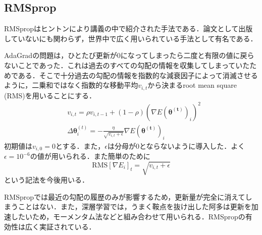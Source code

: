 \documentclass[a4paper,11pt]{jsreport}
\begin{document}
\subsection{RMSprop}
RMSpropはヒントンにより講義の中で紹介された手法である．論文として出版していないにも関わらず，世界中で広く用いられている手法として有名である．\par
AdaGradの問題は，ひとたび更新が$0$になってしまったら二度と有限の値に戻らないことであった．これは過去のすべての勾配の情報を収集してしまっていたためである．そこで十分過去の勾配の情報を指数的な減衰因子によって消滅させるように，二乗和ではなく指数的な移動平均$v_{i,t}$から決まるroot mean square (RMS)を用いることにする．
\begin{align}
   & v_{i,t}
  = \rho v_{i,t-1} + (1-\rho) (\nabla E(\bm{\theta^{(t)}})_i)^2 \label{RMSprop} \\
   & \Delta \bm{\theta}_i^{(t)}
  = - \frac{\eta}{\sqrt{v_{i,t}+\epsilon}} \nabla E(\bm{\theta^{(t)}})_i
\end{align}
初期値は$v_{i,0}=0$とする．また，$\epsilon$は分母が$0$とならないように導入した．よく$\epsilon = 10^{-6}$の値が用いられる．また簡単のために
\begin{equation}
  \mathrm{RMS}[\nabla E_i]_t = \sqrt{v_{i,t} + \epsilon}
\end{equation}
という記法を今後用いる．\par
RMSpropでは最近の勾配の履歴のみが影響するため，更新量が完全に消えてしまうことはない．また，深層学習では，うまく鞍点を抜け出した阿多は更新を加速したいため，モーメンタム法などと組み合わせて用いられる．RMSpropの有効性は広く実証されている．
\end{document}
